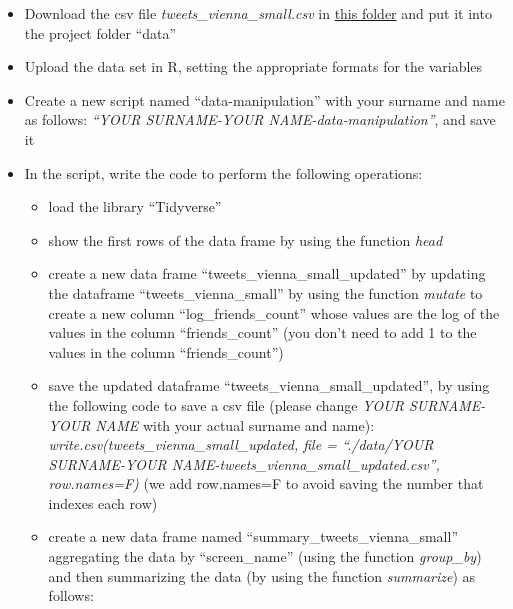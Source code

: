 \documentclass[
]{article}
\begin{document}
\begin{itemize}
\item
  Download the csv file \emph{tweets\_vienna\_small.csv} in \href{https://drive.google.com/file/d/1RKPFOLsIAPLuACcrcB0iiq289CvDDgiT/view?usp=sharing}{this folder} and put it into the project folder ``data''
\item
  Upload the data set in R, setting the appropriate formats for the variables
\item
  Create a new script named ``data-manipulation'' with your surname and name as follows: \emph{``YOUR SURNAME-YOUR NAME-data-manipulation''}, and save it
\item
  In the script, write the code to perform the following operations:

  \begin{itemize}
  \item
    load the library ``Tidyverse''
  \item
    show the first rows of the data frame by using the function \emph{head}
  \item
    create a new data frame ``tweets\_vienna\_small\_updated'' by updating the dataframe ``tweets\_vienna\_small'' by using the function \emph{mutate} to create a new column ``log\_friends\_count'' whose values are the log of the values in the column ``friends\_count'' (you don't need to add 1 to the values in the column ``friends\_count'')
  \item
    save the updated dataframe ``tweets\_vienna\_small\_updated'', by using the following code to save a csv file (please change \emph{YOUR SURNAME-YOUR NAME} with your actual surname and name): \emph{write.csv(tweets\_vienna\_small\_updated, file = ``./data/YOUR SURNAME-YOUR NAME-tweets\_vienna\_small\_updated.csv'', row.names=F)} (we add row.names=F to avoid saving the number that indexes each row)
  \item
    create a new data frame named ``summary\_tweets\_vienna\_small'' aggregating the data by ``screen\_name'' (using the function \emph{group\_by}) and then summarizing the data (by using the function \emph{summarize}) as follows:


\end{itemize}
\end{itemize}
\end{document}
